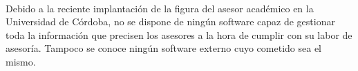 \paragraph{}Debido a la reciente implantación de la figura del asesor académico
en la Universidad de Córdoba, no se dispone de ningún software capaz de
gestionar toda la información que precisen los asesores a la hora de cumplir
con su labor de asesoría. Tampoco se conoce ningún software externo cuyo
cometido sea el mismo.